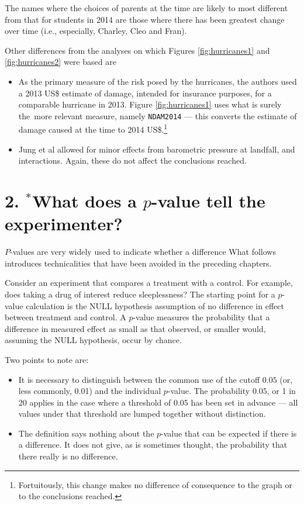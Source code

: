 \documentclass[
  10pt,
  b5paper]{book}
\providecommand{\tightlist}{%
  \setlength{\itemsep}{0pt}\setlength{\parskip}{0pt}}
\begin{document}
The names where the choices of parents at the time are likely to
most different from that for students in 2014 are those where
there has been greatest change over time (i.e., especially,
Charley, Cleo and Fran).

\enlargethispage{21pt}

Other differences from the analyses on which Figures
\ref{fig:hurricanes1} and \ref{fig:hurricanes2} were based
are

\begin{itemize}
\tightlist
\item
  As the primary measure of the risk posed by the hurricanes, the
  authors used a 2013 US\$ estimate of damage, intended for
  insurance purposes, for a comparable hurricane in 2013. Figure
  \ref{fig:hurricanes1} uses what is surely the~more relevant
  measure, namely \texttt{NDAM2014} --- this converts the estimate of
  damage caused at the time to 2014 US\$.\footnote{Fortuitously, this
    change makes no difference of consequence to the graph or to
    the conclusions reached.}
\item
  Jung et al allowed for minor effects from barometric pressure
  at landfall, and interactions. Again, these do not affect
  the conclusions reached.
\end{itemize}

\hypertarget{pval}{%
\section*{\texorpdfstring{2. \(^*\)What does a \(p\)-value tell the experimenter?}{2. \^{}*What does a p-value tell the experimenter?}}\label{pval}}

\(P\)-values are very widely used to indicate whether a difference
What follows introduces technicalities that have been avoided in the
preceding chapters.

Consider an experiment that compares a treatment with a control.
For example, does taking a drug of interest reduce sleeplessness?
The starting point for a \(p\)-value calculation is the NULL
hypothesis assumption of no difference in effect between
treatment and control.
A \(p\)-value measures the probability that a difference in
measured effect as small as that observed, or smaller would,
assuming the NULL hypothesis, occur by chance.

Two points to note are:

\begin{itemize}
\tightlist
\item
  It is necessary to distinguish between the common use of the
  cutoff \(0.05\) (or, less commonly, 0.01) and the individual \(p\)-value.
  The probability \(0.05\), or 1 in 20 applies in the case where
  a threshold of 0.05 has been set in advance --- all values
  under that threshold are lumped together without distinction.
\item
  The definition says nothing about the \(p\)-value that can be expected
  if there is a difference. It does not give, as is sometimes thought,
  the probability that there really is no difference.
\end{itemize}
\end{document}
